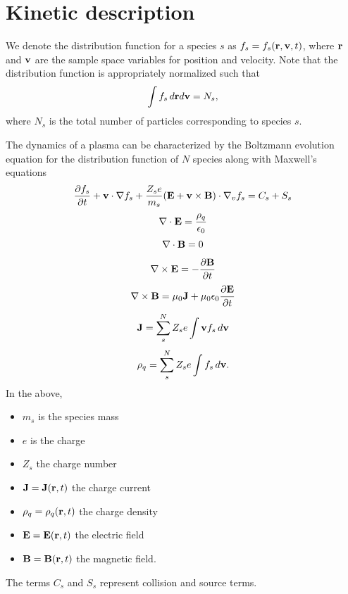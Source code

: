 \documentclass[a4paper,11pt]{report}
\begin{document}
\section{Kinetic description}
We denote the distribution function for a species $s$ as $f_s = f_s(\mathbf{r}, \mathbf{v}, t)$, where $\mathbf{r}$ and $\mathbf{v}$ are the sample space variables for position and velocity. Note that the distribution function is appropriately normalized such that
\begin{equation}
\int f_s \, d\mathbf{r} d\mathbf{v} = N_s,
\end{equation}
where $N_s$ is the total number of particles corresponding to species $s$. 

The dynamics of a plasma can be characterized by the Boltzmann evolution equation for the distribution function of $N$ species along with Maxwell's equations
\begin{equation}
\label{eq:kinetic_equation}
\frac{\partial f_s}{\partial t} + \mathbf{v} \cdot \nabla f_s + \frac{Z_s e}{m_s} ( \mathbf{E} + \mathbf{v} \times \mathbf{B} ) \cdot \nabla_v f_s = C_s + S_s
\end{equation}
\begin{equation}
\label{eq:maxwell_3}
\nabla \cdot \mathbf{E} = \frac{\rho_q}{\epsilon_0} 
\end{equation}
\begin{equation}
\label{eq:maxwell_4}
\nabla \cdot \mathbf{B} = 0
\end{equation}
\begin{equation}
\label{eq:maxwell_1}
\nabla \times \mathbf{E} = -\frac{ \partial \mathbf{B}}{\partial t}
\end{equation}
\begin{equation}
\label{eq:maxwell_2}
\nabla \times \mathbf{B} = \mu_0 \mathbf{J} + \mu_0 \epsilon_0 \frac{\partial \mathbf{E}}{\partial t}
\end{equation}
\begin{equation}
\mathbf{J} = \sum_s^N Z_s e \int \mathbf{v} f_s \, d\mathbf{v}
\end{equation}
\begin{equation}
\rho_q = \sum_s^N Z_s e \int f_s \, d\mathbf{v}.
\end{equation}
In the above, 
\begin{itemize}
\item $m_s$ is the species mass
\item $e$ is the charge
\item $Z_s$ the charge number
\item $\mathbf{J} = \mathbf{J}(\mathbf{r},t)$ the charge current
\item $\rho_q = \rho_q(\mathbf{r},t)$ the charge density
\item $\mathbf{E} = \mathbf{E}(\mathbf{r},t)$ the electric field
\item $\mathbf{B} = \mathbf{B}(\mathbf{r},t)$ the magnetic field.
\end{itemize}
The terms $C_s$ and $S_s$ represent collision and source terms.
\end{document}

